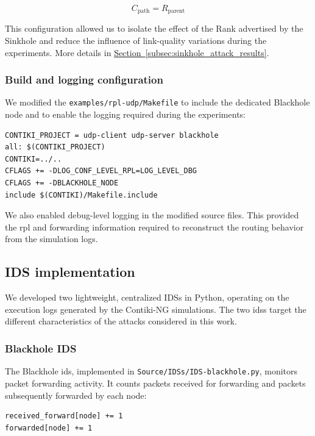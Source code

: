 \begin{equation}
C_{\mathrm{path}} = R_{\mathrm{parent}}
\end{equation}

This configuration allowed us to isolate the effect of the Rank advertised by the Sinkhole and reduce the influence of link-quality variations during the experiments.
More details in \hyperref[subsec:sinkhole_attack_results]{Section~\ref{subsec:sinkhole_attack_results}}.

\subsubsection{Build and logging configuration}
\label{subsubsec:build_configuration}

We modified the \texttt{examples/rpl-udp/Makefile} to include the dedicated Blackhole node and to enable the logging required during the experiments:

\begin{verbatim}
CONTIKI_PROJECT = udp-client udp-server blackhole
all: $(CONTIKI_PROJECT)
CONTIKI=../..
CFLAGS += -DLOG_CONF_LEVEL_RPL=LOG_LEVEL_DBG
CFLAGS += -DBLACKHOLE_NODE
include $(CONTIKI)/Makefile.include
\end{verbatim}

We also enabled debug-level logging in the modified source files.
This provided the \gls{rpl} and forwarding information required to reconstruct the routing behavior from the simulation logs.

\subsection{IDS implementation}
\label{subsec:ids_implementation}
We developed two lightweight, centralized IDSs in Python, operating on the execution logs generated by the Contiki-NG simulations.
The two \glspl{ids} target the different characteristics of the attacks considered in this work.

\subsubsection{Blackhole IDS}
The Blackhole \gls{ids}, implemented in \texttt{Source/IDSs/IDS-blackhole.py}, monitors packet forwarding activity.
It counts packets received for forwarding and packets subsequently forwarded by each node:

\begin{verbatim}
received_forward[node] += 1
forwarded[node] += 1
\end{verbatim}

